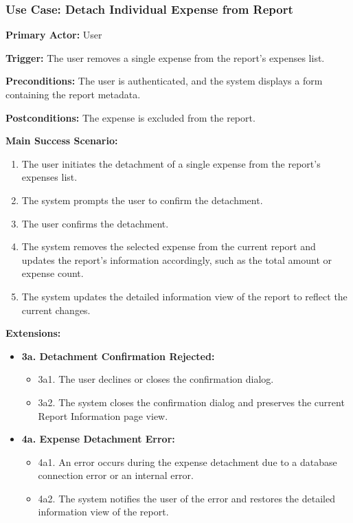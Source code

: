 \subsubsection{\textbf{Use Case: Detach Individual Expense from Report}}

\textbf{Primary Actor:} User

\textbf{Trigger:} The user removes a single expense from the report’s expenses list.

\textbf{Preconditions:} The user is authenticated, and the system displays a form containing the report metadata.

\textbf{Postconditions:} The expense is excluded from the report.

\vspace{0.5cm}

\textbf{Main Success Scenario:}

\begin{enumerate} [leftmargin=0.75cm, noitemsep]
\item The user initiates the detachment of a single expense from the report’s expenses list.
\item The system prompts the user to confirm the detachment.
\item The user confirms the detachment.
\item The system removes the selected expense from the current report and updates the report’s information accordingly, such as the total amount or expense count.
\item The system updates the detailed information view of the report to reflect the current changes.
\end{enumerate}

\vspace{0.3cm}

\textbf{Extensions:}

\begin{itemize} [label={}, leftmargin=0.75cm, noitemsep]

    \item \textbf{3a. Detachment Confirmation Rejected:}
    \begin{itemize} [label={}, leftmargin=0.75cm, noitemsep]
        \item 3a1. The user declines or closes the confirmation dialog.
        \item 3a2. The system closes the confirmation dialog and preserves the current Report Information page view.
    \end{itemize}

    \item \textbf{4a. Expense Detachment Error:}
    \begin{itemize} [label={}, leftmargin=0.75cm, noitemsep]
        \item 4a1. An error occurs during the expense detachment due to a database connection error or an internal error.
        \item 4a2. The system notifies the user of the error and restores the detailed information view of the report.
    \end{itemize}

\end{itemize}

\vspace{0.3cm}
